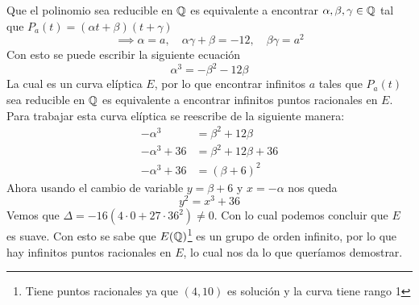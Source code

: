 \begin{sol}
	Que el polinomio sea reducible en $\mathbb{Q}$ es equivalente a encontrar $\alpha,\beta,\gamma\in\mathbb{Q}$ tal que $P_a(t)=(\alpha t+\beta)(t+\gamma)$
	\[
		\implies \alpha = a,\quad \alpha\gamma+\beta=-12,\quad \beta\gamma=a^2
	\]
	Con esto se puede escribir la siguiente ecuación
	\[
		\alpha^3=-\beta^2-12\beta
	\]
	La cual es un curva elíptica $E$, por lo que encontrar infinitos $a$ tales que $P_a(t)$ sea reducible en $\mathbb{Q}$ es equivalente a encontrar infinitos puntos racionales en $E$.\\
	Para trabajar esta curva elíptica se reescribe de la siguiente manera:
	\begin{align*}
		-\alpha^3    & =\beta^2+12\beta    \\
		-\alpha^3+36 & =\beta^2+12\beta+36 \\
		-\alpha^3+36 & =(\beta+6)^2
    \end{align*}
    Ahora usando el cambio de variable $y=\beta+6$ y $x=-\alpha$ nos queda
    \[
        y^2=x^3+36
    \]
    Vemos que $\Delta=-16(4\cdot 0+27\cdot36^2)\neq0$. Con lo cual podemos concluir que $E$ es suave. Con esto se sabe que $E(\mathbb{Q})$\footnote{Tiene puntos racionales ya que $(4,10)$ es solución y la curva tiene rango 1\citep{prog}} es un grupo de orden infinito, por lo que hay infinitos puntos racionales en $E$, lo cual nos da lo que queríamos demostrar.
\end{sol}




